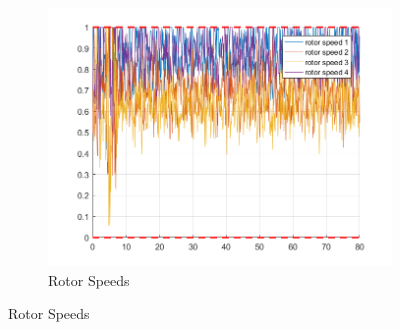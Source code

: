 \documentclass[11pt]{article}
\begin{document}
\begin{enumerate}
\begin{figure}[ht]
\begin{subfigure}[c]{0.3\linewidth}
            \includegraphics[width=\linewidth]{Plots_11_NonlinearModel_StepSignal/06}
            \caption{Rotor Speeds}
        \end{subfigure}


\end{figure}
\end{enumerate}
\end{document}
